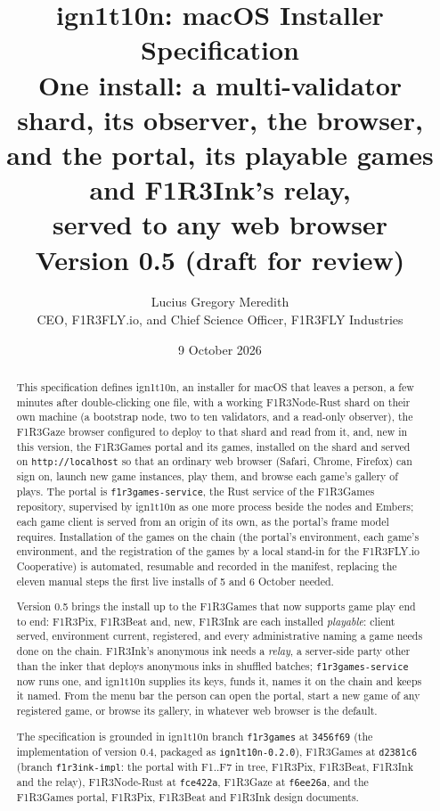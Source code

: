 \documentclass[11pt]{article}
\title{\textbf{ign1t10n: macOS Installer Specification}\\[4pt]
\large One install: a multi-validator \Nd{} shard, its observer, the \Gz{} browser,\\
and the \Gm{} portal, its playable games and F1R3Ink's relay,\\
served to any web browser\\[6pt]
\normalsize Version 0.5 (draft for review)}
\author{Lucius Gregory Meredith\\
\small CEO, F1R3FLY.io, and Chief Science Officer, F1R3FLY Industries}
\date{9 October 2026}
\theoremstyle{definition}
\theoremstyle{remark}
\newcommand{\code}[1]{\texttt{#1}}
\newcommand{\Gz}{F1R3Gaze}
\newcommand{\Hr}{ign1t10n}
\newcommand{\Nd}{F1R3Node-Rust}
\newcommand{\Gm}{F1R3Games}
\newcommand{\Svc}{\code{f1r3games-service}}
\newcommand{\Em}{Embers}
\begin{document}
\maketitle

\begin{abstract}
\noindent
This specification defines \Hr{}, an installer for macOS that leaves a person, a
few minutes after double-clicking one file, with a working \Nd{} shard on their own
machine (a bootstrap node, two to ten validators, and a read-only observer), the
\Gz{} browser configured to deploy to that shard and read from it, and, new in this
version, the \Gm{} portal and its games, installed on the shard and served on
\code{http://localhost} so that an ordinary web browser (Safari, Chrome, Firefox) can
sign on, launch new game instances, play them, and browse each game's gallery of
plays. The portal is \Svc{}, the Rust service of the \Gm{} repository, supervised by
\Hr{} as one more process beside the nodes and \Em{}; each game client is served from
an origin of its own, as the portal's frame model requires. Installation of the games
on the chain (the portal's environment, each game's environment, and the
registration of the games by a local stand-in for the F1R3FLY.io Cooperative) is
automated, resumable and recorded in the manifest, replacing the eleven manual steps
the first live installs of 5 and 6 October needed.

Version 0.5 brings the install up to the \Gm{} that now supports game play end to
end: F1R3Pix, F1R3Beat and, new, F1R3Ink are each installed \emph{playable}: client
served, environment current, registered, and every administrative naming a game needs
done on the chain. F1R3Ink's anonymous ink needs a \emph{relay}, a server-side party
other than the inker that deploys anonymous inks in shuffled batches; \Svc{} now runs
one, and \Hr{} supplies its keys, funds it, names it on the chain and keeps it named.
From the menu bar the person can open the portal, start a new game of any registered
game, or browse its gallery, in whatever web browser is the default.

The specification is grounded in \Hr{} branch \code{f1r3games} at \code{3456f69} (the
implementation of version 0.4, packaged as \code{ign1t10n-0.2.0}), \Gm{} at
\code{d2381c6} (branch \code{f1r3ink-impl}: the portal with F1..F7 in tree, F1R3Pix,
F1R3Beat, F1R3Ink and the relay), \Nd{} at \code{fce422a}, \Gz{} at \code{f6ee26a},
and the \Gm{} portal, F1R3Pix, F1R3Beat and F1R3Ink design documents.
\end{abstract}
\end{document}
